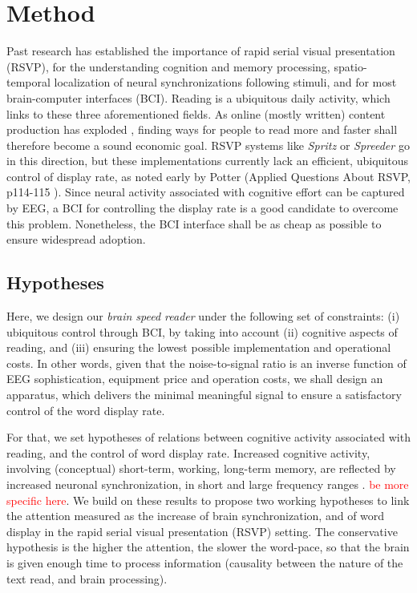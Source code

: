 \section{Method}
\label{method}
Past research has established the importance of rapid serial visual presentation (RSVP), for the understanding cognition and memory processing, spatio-temporal localization of neural synchronizations following stimuli, and for most brain-computer interfaces (BCI). Reading is a ubiquitous daily activity, which links to these three aforementioned fields.  As online (mostly written) content production has exploded \cite{something about reading more with the Internet}, finding ways for people to read more and faster shall therefore become a sound economic goal. RSVP systems like {\it Spritz} \cite{} or {\it Spreeder} \cite{} go in this direction, but these implementations currently lack an efficient, ubiquitous control of display rate, as noted early by Potter (Applied Questions About RSVP, p114-115 \cite{potter1984rapid}). Since neural activity associated with cognitive effort can be captured by EEG, a BCI for controlling the display rate is a good candidate to overcome this problem. Nonetheless, the BCI interface shall be as cheap as possible to ensure widespread adoption.

\subsection{Hypotheses}
\label{hypo}
Here, we design our {\it brain speed reader} under the following set of constraints: (i) ubiquitous control through BCI, by taking into account (ii) cognitive aspects of reading, and (iii) ensuring the lowest possible implementation and operational costs. In other words, given that the noise-to-signal ratio is an inverse function of EEG sophistication, equipment price and operation costs, we shall design an apparatus, which delivers the minimal meaningful signal to ensure a satisfactory control of the word display rate.

For that, we set hypotheses of relations between cognitive activity associated with reading, and the control of word display rate. Increased cognitive activity, involving (conceptual) short-term, working, long-term memory, are reflected by increased neuronal synchronization, in short \cite{} and large frequency ranges \cite{}. \textcolor{red}{be more specific here}. We build on these results to propose two working hypotheses to link the attention measured as the increase of brain synchronization, and of word display in the rapid serial visual presentation (RSVP) setting. The conservative hypothesis is the higher the attention, the slower the word-pace, so that the brain is given enough time to process information (causality between the nature of the text read, and brain processing).


